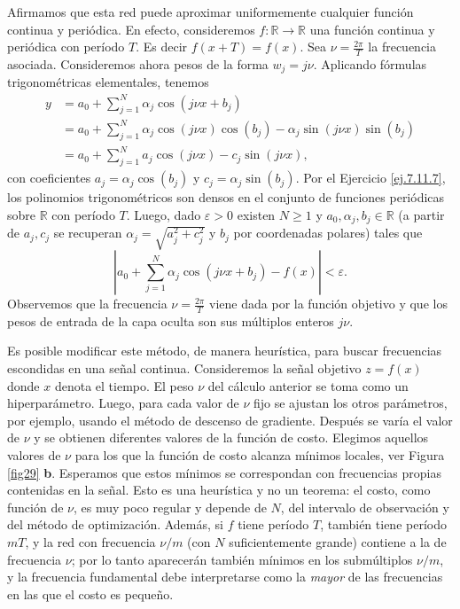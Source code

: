 \documentclass[12pt, a4paper]{amsbook}
\newcommand{\ve}{\varepsilon}
\newcommand{\R}{{\mathbb R}}
\theoremstyle{remark}
\theoremstyle{definition}
\numberwithin{section}{chapter}
\numberwithin{subsection}{section}
\numberwithin{equation}{section}
\numberwithin{figure}{chapter}
\begin{document}
Afirmamos que esta red puede aproximar uniformemente cualquier función continua y periódica. En efecto, consideremos $f\colon \R\to\R$ una función continua y periódica con período $T$. Es decir $f(x+T)=f(x)$. Sea $\nu=\frac{2\pi}{T}$ la frecuencia asociada. Consideremos ahora pesos de la forma $w_j = j\nu$. Aplicando fórmulas trigonométricas elementales, tenemos
\begin{align*}
y &= a_0 + \sum_{j=1}^N \alpha_j \cos(j\nu x + b_j)\\
&=a_0 + \sum_{j=1}^N \alpha_j \cos(j\nu x)\cos(b_j) - \alpha_j \sin(j\nu x)\sin(b_j)\\
&=a_0 + \sum_{j=1}^N a_j \cos(j\nu x) - c_j \sin(j\nu x),
\end{align*}
con coeficientes $a_j = \alpha_j \cos(b_j)$ y $c_j = \alpha_j\sin(b_j)$. Por el Ejercicio \ref{ej.7.11.7}, los polinomios trigonométricos son densos en el conjunto de funciones periódicas sobre $\R$ con período $T$. Luego, dado $\ve>0$ existen $N\ge1$ y $a_0,\alpha_j, b_j\in \R$ (a partir de $a_j,c_j$ se recuperan $\alpha_j=\sqrt{a_j^2+c_j^2}$ y $b_j$ por coordenadas polares) tales que
$$
\left| a_0 + \sum_{j=1}^N \alpha_j \cos(j\nu x + b_j) - f(x)\right| < \ve. 
$$
Observemos que la frecuencia $\nu=\frac{2\pi}{T}$ viene dada por la función objetivo y que los pesos de entrada de la capa oculta son sus múltiplos enteros $j\nu$.

Es posible modificar este método, de manera heurística, para buscar frecuencias escondidas en una señal continua. Consideremos la señal objetivo $z=f(x)$ donde $x$ denota el tiempo. El peso $\nu$ del cálculo anterior se toma como un hiperparámetro. Luego, para cada valor de $\nu$ fijo se ajustan los otros parámetros, por ejemplo, usando el método de descenso de gradiente. Después se varía el valor de $\nu$ y se obtienen diferentes valores de la función de costo. Elegimos aquellos valores de $\nu$ para los que la función de costo alcanza mínimos locales, ver Figura \ref{fig29} {\bf b}. Esperamos que estos mínimos se correspondan con frecuencias propias contenidas en la señal. Esto es una heurística y no un teorema: el costo, como función de $\nu$, es muy poco regular y depende de $N$, del intervalo de observación y del método de optimización. Además, si $f$ tiene período $T$, también tiene período $mT$, y la red con frecuencia $\nu/m$ (con $N$ suficientemente grande) contiene a la de frecuencia $\nu$; por lo tanto aparecerán también mínimos en los submúltiplos $\nu/m$, y la frecuencia fundamental debe interpretarse como la {\em mayor} de las frecuencias en las que el costo es pequeño.
\end{document}
